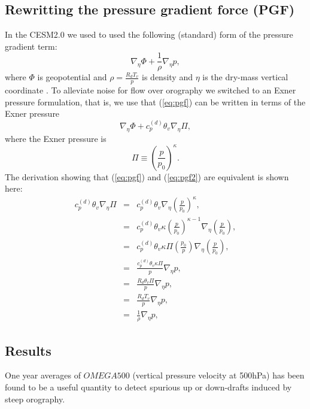 \documentclass[draft]{agujournal2019}
\begin{document}
\subsection{Rewritting the pressure gradient force (PGF)}
In the CESM2.0 we used to used the following (standard) form of the pressure gradient term:
\begin{equation}
\label{eq:pgf}
    \nabla_{\eta }\Phi+\frac{1}{\rho}\nabla_{\eta }p,
\end{equation}
where $\Phi$ is geopotential and $\rho=\frac{R_dT_v}{p}$ is density and $\eta $ is the dry-mass vertical coordinate \cite<for details see >{LetAl2018JAMES}. To alleviate noise for flow over orography we switched to an Exner pressure formulation, that is, we use that (\ref{eq:pgf}) can be written in terms of the Exner pressure
\begin{equation}\label{eq:pgf2}
    \nabla_{\eta }\Phi+c_p^{(d)}\theta_v\nabla_{\eta }\Pi,
\end{equation}
where the Exner pressure is
\begin{equation}
    \Pi\equiv \left( \frac{p}{p_0}\right)^{\kappa}.
\end{equation}
The derivation showing that (\ref{eq:pgf}) and (\ref{eq:pgf2}) are equivalent is shown here:
\begin{eqnarray*}
c_p^{(d)}\theta_v\nabla_{\eta }\Pi &=& c_p^{(d)}\theta_v\nabla_{\eta }\left( \frac{p}{p_0}\right)^{\kappa},\\
&=& c_p^{(d)}\theta_v\kappa\left( \frac{p}{p_0}\right)^{\kappa-1} \nabla_{\eta }\left( \frac{p}{p_0}\right),\\
&=& c_p^{(d)}\theta_v\kappa\Pi\left( \frac{p_0}{p}\right) \nabla_{\eta }\left(\frac{p}{p_0}\right),\\
&=& \frac{c_p^{(d)}\theta_v\kappa\Pi}{p} \nabla_{\eta }p,\\
&=& \frac{R_d\theta_v\Pi}{p} \nabla_{\eta }p,\\
&=& \frac{R_dT_v}{p} \nabla_{\eta }p,\\
&=& \frac{1}{\rho} \nabla_{\eta }p,
\end{eqnarray*}
\subsection{Results}
One year averages of $OMEGA500$ (vertical pressure velocity at 500hPa) has been found to be a useful quantity to detect spurious up or down-drafts induced by steep orography.


%
%
\end{document}
